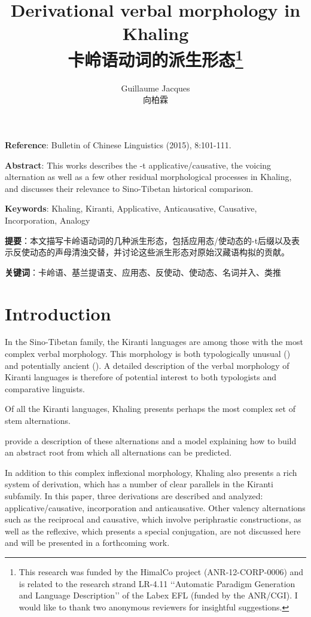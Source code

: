 \documentclass[oldfontcommands,oneside,a4paper,11pt]{article}
\newcommand{\zh}[1]{{\cn #1}}
\begin{document}
 


\title{Derivational verbal morphology in Khaling \\\zh{卡岭语动词的派生形态}\footnote{This research was funded by the HimalCo project (ANR-12-CORP-0006) and is related to the research strand LR-4.11 ‘‘Automatic Paradigm Generation and Language Description’’ of the Labex EFL (funded by the ANR/CGI). I would like to thank two anonymous reviewers for insightful suggestions.  } }
\author{Guillaume Jacques \\\zh{向柏霖}}
\maketitle

\textbf{Reference}: Bulletin of Chinese Linguistics (2015), 8:101-111.

\textbf{Abstract}: This works describes the -t applicative/causative, the voicing alternation as well as a few other residual morphological processes in Khaling, and discusses their relevance to Sino-Tibetan historical comparison.

\textbf{Keywords}: Khaling, Kiranti, Applicative, Anticausative, Causative, Incorporation,  Analogy

\zh{\textbf{提要}：本文描写卡岭语动词的几种派生形态，包括应用态/使动态的-t后缀以及表示反使动态的声母清浊交替，并讨论这些派生形态对原始汉藏语构拟的贡献。}

\zh{\textbf{关键词}：卡岭语、基兰提语支、应用态、反使动、使动态、名词并入、类推}

\section{Introduction}
In the Sino-Tibetan family, the Kiranti languages are among those with the most complex verbal morphology. This morphology is both typologically unusual (\citealt{bickel07chintang}) and potentially ancient (\citealt{jacques12agreement, delancey14second}). A detailed description of the verbal morphology of Kiranti languages is therefore of potential interest to both typologists and comparative linguists.

Of all the Kiranti languages, Khaling presents perhaps the  most complex set of stem alternations. 

 \citet{jacques12khaling} provide a description of these alternations and a model explaining how to build an abstract root  from which all alternations can be predicted.

In addition to this complex inflexional morphology, Khaling also presents a rich system of derivation, which has a number of clear parallels in the Kiranti subfamily. In this paper, three derivations are described and analyzed: applicative/causative, incorporation and anticausative. Other valency alternations such as the reciprocal and causative, which involve periphrastic constructions, as well as the reflexive, which presents a special conjugation, are not discussed here and will be presented in a forthcoming work.
\end{document}
